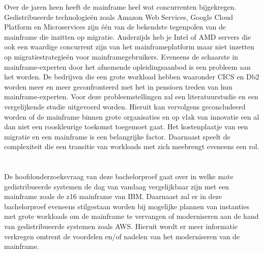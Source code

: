 Over de jaren heen heeft de mainframe heel wat concurrenten bijgekregen. Gedistribueerde technologieën zoals Amazon Web Services, Google Cloud Platform en Microservices zijn één van de bekendste tegenpolen van de mainframe die inzitten op migratie. Anderzijds heb je Intel of AMD servers die ook een waardige concurrent zijn van het mainframeplatform maar niet inzetten op migratiestrategieën voor mainframegebruikers. Eveneens de schaarste in mainframe-experten door het afnemende opleidingsaanbod is een probleem aan het worden. De bedrijven die een grote workload hebben waaronder CICS en Db2 worden meer en meer geconfronteerd met het in pensioen treden van hun mainframe-experten. Voor deze probleemstellingen zal een literatuurstudie en een vergelijkende studie uitgevoerd worden. Hieruit kan vervolgens geconcludeerd worden of de mainframe binnen grote organisaties en op vlak van innovatie een al dan niet een rooskleurige toekomst toegemoet gaat. Het kostenplaatje van een migratie en een mainframe is een belangrijke factor. Daarnaast speelt de complexiteit die een transitie van workloads met zich meebrengt eveneens een rol. 

\section{}
\label{sec:onderzoeksvraag}

De hoofdonderzoeksvraag van deze bachelorproef gaat over in welke mate gedistribueerde systemen de dag van vandaag vergelijkbaar zijn met een mainframe zoals de z16 mainframe van IBM. Daarnaast zal er in deze bachelorproef eveneens stilgestaan worden bij mogelijke plannen van instanties met grote workloads om de mainframe te vervangen of moderniseren aan de hand van gedistribueerde systemen zoals AWS. Hieruit wordt er meer informatie verkregen omtrent de voordelen en/of nadelen van het moderniseren van de mainframe. 

\section{}
\label{sec:onderzoeksdoelstelling}

\subsection{}

